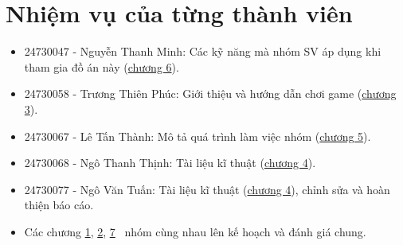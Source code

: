 \documentclass[12pt]{report}
\begin{document}
\section{Nhiệm vụ của từng thành viên}
\begin{itemize}
    \item 24730047 - Nguyễn Thanh Minh: Các kỹ năng mà nhóm SV áp dụng khi tham gia đồ án này (\hyperref[sec:used_skills]{chương 6}).
    \item 24730058 - Trương Thiên Phúc: Giới thiệu và hướng dẫn chơi game (\hyperref[sec:game_tutorial]{chương 3}).
    \item 24730067 - Lê Tấn Thành: Mô tả quá trình làm việc nhóm (\hyperref[sec:game_tutorial]{chương 5}).
    \item 24730068 - Ngô Thanh Thịnh: Tài liệu kĩ thuật (\hyperref[sec:technical_detail]{chương 4}).
    \item 24730077 - Ngô Văn Tuấn: Tài liệu kĩ thuật (\hyperref[sec:technical_detail]{chương 4}), chỉnh sửa và hoàn thiện báo cáo.

    \item Các chương \hyperref[sec:group_contract]{1}, \hyperref[sec:work_space]{2}, \hyperref[sec:member_ratings]{7} \
          nhóm cùng nhau lên kế hoạch và đánh giá chung.
\end{itemize}
\end{document}

